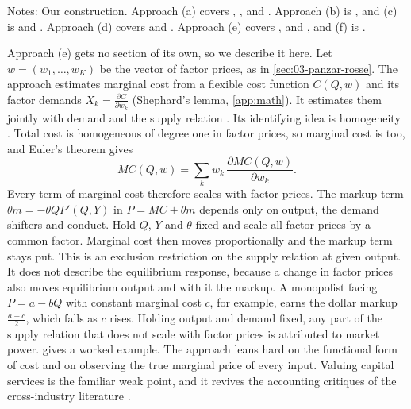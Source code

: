 \begin{table}[!htb]
\begin{threeparttable}
\begin{tabularx}{\textwidth}{@{}>{\raggedright\arraybackslash}p{2.3cm}
  >{\raggedright\arraybackslash}X >{\raggedright\arraybackslash}X >{\raggedright\arraybackslash}X
  >{\raggedright\arraybackslash}p{1.5cm}@{}}
\bottomrule
\end{tabularx}
\begin{tablenotes}\footnotesize
\item Notes: Our construction. Approach (a) covers \citet{Sumner1981}, \citet{Sullivan1985},
\citet{AshenfelterSullivan1987} and \citet{PanzarRosse1987}. Approach (b) is \citet{BakerBresnahan1988}, and (c) is
\citet{Bresnahan1982} and \citet{Lau1982}. Approach (d) covers \citet{GenesoveMullin1998} and \citet{Wolfram1999}.
Approach (e) covers \citet{GollopRoberts1979}, \citet{Appelbaum1979,Appelbaum1982} and \citet{Hall1988}, and (f) is
\citet{Porter1983}.
\end{tablenotes}
\end{threeparttable}
\end{table}

Approach (e) gets no section of its own, so we describe it here. Let $w = (w_1, \dots, w_K)$ be the vector of factor
prices, as in \cref{sec:03-panzar-rosse}. The approach estimates marginal cost from a flexible cost function $C(Q, w)$
and its factor demands $X_k = \frac{\partial C}{\partial w_k}$ (Shephard's lemma, \cref{app:math}). It estimates them
jointly with demand and the supply relation \citep[Section~3.3]{Bresnahan1989}. Its identifying idea is homogeneity
\citep[p.~1034]{Bresnahan1989}. Total cost is homogeneous of degree one in factor prices, so marginal cost is too, and
Euler's theorem gives
\begin{equation*}
MC(Q, w) = \sum_{k} w_k\,\frac{\partial MC(Q, w)}{\partial w_k}.
\end{equation*}
Every term of marginal cost therefore scales with factor prices. The markup term $\theta m = -\theta Q P'(Q, Y)$ in
$P = MC + \theta m$ depends only on output, the demand shifters and conduct. Hold $Q$, $Y$ and $\theta$ fixed and scale
all factor prices by a common factor. Marginal cost then moves proportionally and the markup term stays put. This is an
exclusion restriction on the supply relation at given output. It does not describe the equilibrium response, because a
change in factor prices also moves equilibrium output and with it the markup. A monopolist facing $P = a - bQ$ with
constant marginal cost $c$, for example, earns the dollar markup $\frac{a - c}{2}$, which falls as $c$ rises. Holding
output and demand fixed, any part of the supply relation that does not scale with factor prices is attributed to market
power.
 gives a worked example. The approach leans hard on the functional form of cost and on observing
the true marginal price of every input. Valuing capital services is the familiar weak point, and it revives the
accounting critiques of the cross-industry literature \citep[p.~1040]{Bresnahan1989}.

